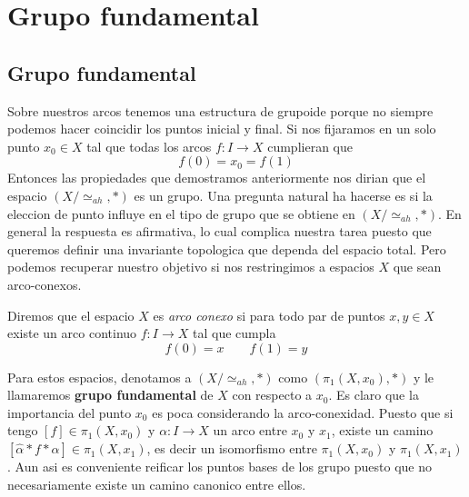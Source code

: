 \section{Grupo fundamental}




\subsection{Grupo fundamental}
Sobre nuestros arcos tenemos una estructura de grupoide porque no siempre
podemos hacer coincidir los puntos inicial y final. Si nos fijaramos en
un solo punto \(x_0 \in X\) tal que todas los arcos \(f : I \to X\)
cumplieran que
\[ f(0) = x_0 = f (1) \]
Entonces las propiedades que demostramos anteriormente nos dirian que el
espacio \((X / \simeq_{ah}, *)\) es un grupo. Una pregunta natural ha
hacerse es si la eleccion de punto influye en el tipo de grupo que se
obtiene en \((X / \simeq_{ah}, *)\). En general la respuesta es
afirmativa, lo cual complica nuestra tarea puesto que queremos definir
una invariante topologica que dependa del espacio total. Pero podemos
recuperar nuestro objetivo si nos restringimos a espacios \(X\) que sean
arco-conexos.
\begin{definicion}
  Diremos que el espacio \(X\) es \emph{arco conexo} si para todo par de
  puntos \(x,y \in X\) existe un arco continuo \(f : I \to X\) tal que
  cumpla
  \[ f(0) = x \qquad f(1) = y \]
\end{definicion}
Para estos espacios, denotamos a \((X / \simeq_{ah}, *)\) como
\((\pi_1(X,x_0), *)\) y le llamaremos \textbf{grupo fundamental} de \(X\) con
respecto a \(x_0\). Es claro que la importancia del punto \(x_0\) es poca
considerando la arco-conexidad. Puesto que si tengo \([f] \in
\pi_1(X,x_0)\) y \(\alpha : I \to X\) un arco entre \(x_0\) y \(x_1\),
existe un camino \([\hat{\alpha} * f * \alpha] \in \pi_1(X,x_1)\), es
decir un isomorfismo entre \(\pi_1 (X, x_0)\) y \(\pi_1 (X, x_1)\). Aun
asi es conveniente reificar los puntos bases de los grupo puesto que no
necesariamente existe un camino canonico entre ellos.

